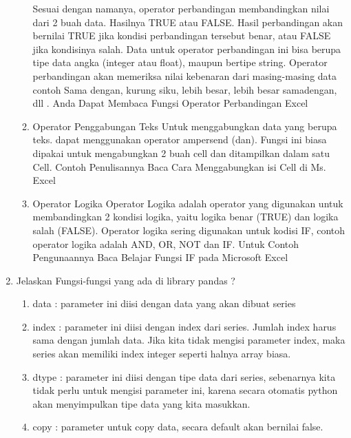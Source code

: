 \begin{enumerate}
\begin{enumerate}
Sesuai dengan namanya, operator perbandingan membandingkan nilai dari 2 buah data. Hasilnya TRUE atau FALSE. Hasil perbandingan akan bernilai TRUE jika kondisi perbandingan tersebut benar, atau FALSE jika kondisinya salah. Data untuk operator perbandingan ini bisa berupa tipe data angka (integer atau float), maupun bertipe string. Operator perbandingan akan memeriksa nilai kebenaran dari masing-masing data contoh Sama dengan, kurung siku, lebih besar, lebih besar samadengan,  dll . Anda Dapat Membaca Fungsi Operator Perbandingan Excel
\item Operator Penggabungan Teks
Untuk menggabungkan data yang berupa teks. dapat menggunakan operator ampersend (dan). Fungsi ini biasa dipakai untuk mengabungkan 2 buah cell dan ditampilkan dalam satu Cell. Contoh Penulisannya Baca Cara Menggabungkan isi Cell di Ms. Excel
\item Operator Logika
Operator Logika adalah operator yang digunakan untuk membandingkan 2 kondisi logika, yaitu logika benar (TRUE) dan logika salah (FALSE). Operator logika sering digunakan untuk kodisi IF, contoh operator logika adalah  AND, OR, NOT dan IF. Untuk Contoh Pengunaannya Baca Belajar Fungsi IF pada Microsoft Excel
\end{enumerate}
\item Jelaskan Fungsi-fungsi yang ada di library pandas ?
\begin{enumerate}
\item data : parameter ini diisi dengan data yang akan dibuat series
\item index : parameter ini diisi dengan index dari series. Jumlah index harus sama dengan jumlah data. Jika kita tidak mengisi parameter index, maka series akan memiliki index integer seperti halnya array biasa.
\item dtype : parameter ini diisi dengan tipe data dari series, sebenarnya kita tidak perlu untuk mengisi parameter ini, karena secara otomatis python akan menyimpulkan tipe data yang kita masukkan.
\item copy : parameter untuk copy data, secara default akan bernilai false.

\end{enumerate}



\end{enumerate}

